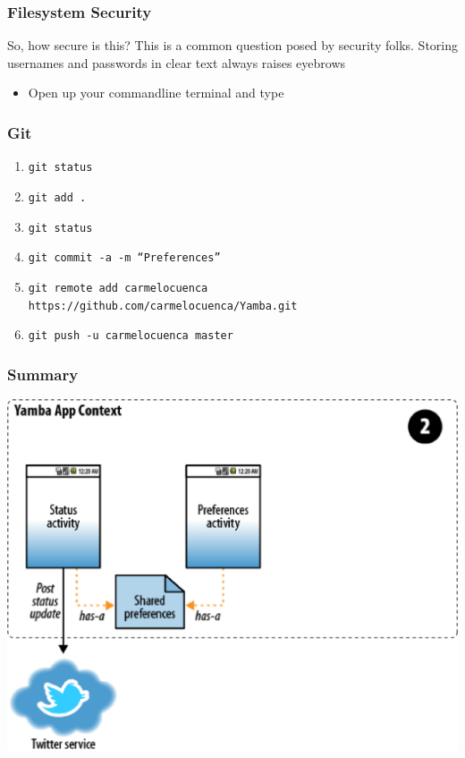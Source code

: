 \begin{frame}[containsverbatim]
\frametitle{Filesystem Security}
So, how secure is this? This is a common question posed by security folks. Storing
usernames and passwords in clear text always raises eyebrows
\begin{itemize}
\item Open up your commandline terminal and type
\end{itemize}

\end{frame}
\begin{frame}[fragile]
\frametitle{Git}
\begin{enumerate}
\item \texttt{git status}
\item \texttt{git add .}
\item \texttt{git status}
\item \texttt{git commit -a -m ``Preferences''}
\item \texttt{git remote add carmelocuenca https://github.com/carmelocuenca/Yamba.git}
\item \texttt{git push -u carmelocuenca master}
\end{enumerate}

\end{frame}
\begin{frame}[containsverbatim]
\frametitle{Summary}
\centering
\includegraphics[width= 0.75 \textwidth]{fig-077.eps}
\end{frame}



